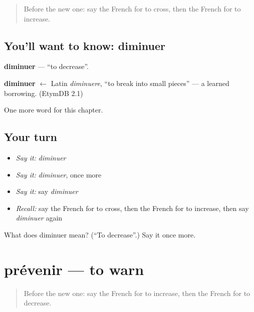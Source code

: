 \label{lesson:FR-C208-diminuer}



\begin{quote}
Before the new one: say the French for to cross, then the French for to increase.
\end{quote}

\subsection*{You'll want to know: diminuer}
\textbf{diminuer} — \textquotedblleft{}to decrease\textquotedblright{}.

\begin{cousinweb}
\textbf{diminuer} $\leftarrow$ Latin \emph{diminuere}, \textquotedblleft{}to break into small pieces\textquotedblright{} — a learned borrowing. (EtymDB 2.1)
\end{cousinweb}

\begin{grammarlens}[title={What you've built}]
One more word for this chapter.
\end{grammarlens}

\subsection*{Your turn}
\begin{itemize}
\raggedright
  \item \emph{Say it:} \emph{diminuer}
  \item \emph{Say it:} \emph{diminuer}, once more
  \item \emph{Say it:} say \emph{diminuer}
  \item \emph{Recall:} say the French for to cross, then the French for to increase, then say \emph{diminuer} again
\end{itemize}

\begin{tcolorbox}[breakable,colback=teal!4,colframe=teal!35!black,title={Before you move on}]
What does diminuer mean? (\textquotedblleft{}To decrease\textquotedblright{}.) Say it once more.
\end{tcolorbox}
\section[prévenir]{prévenir — to warn}

\label{lesson:FR-C208-prevenir}



\begin{quote}
Before the new one: say the French for to increase, then the French for to decrease.
\end{quote}


